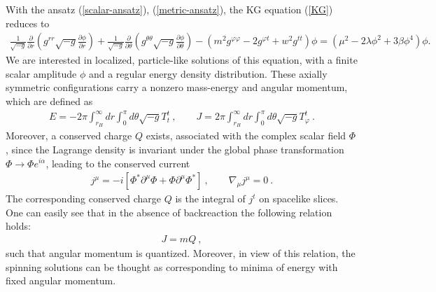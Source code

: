With the ansatz (\ref{scalar-ansatz}), (\ref{metric-ansatz}), 
the KG equation (\ref{KG})
reduces to
\begin{eqnarray}
\label{KG1}
\frac{1}{\sqrt{-g}}\frac{\partial}{\partial r}\left(g^{rr}\sqrt{-g}\frac{\partial \phi}{\partial r} \right)+
\frac{1}{\sqrt{-g}}\frac{\partial}{\partial \theta} \left(g^{\theta \theta}\sqrt{-g}\frac{\partial \phi}{\partial \theta} \right)
-\left(
m^2 g^{\varphi \varphi}-2g^{\varphi t} +w^2 g^{tt} 
\right)\phi
=(\mu^2-2 \lambda \phi^2+3\beta \phi^4)\phi.~{~}
\end{eqnarray}
We are interested in 
localized, particle-like solutions of this equation,
 with a finite scalar amplitude $\phi$ and a regular energy density distribution.
These axially symmetric configurations carry a nonzero 
  mass-energy and angular momentum,  which are defined as
\begin{eqnarray}
\label{scalar-charges}
E=-2\pi \int_{r_H}^\infty dr \int_0^\pi d\theta \sqrt{-g}T_t^t\ , \qquad 
J= 2\pi \int_{r_H}^\infty dr \int_0^\pi d\theta \sqrt{-g}T_\varphi^t \ .
 \end{eqnarray}
%
Moreover, a conserved charge $Q$ exists, associated with the complex scalar field $\Phi$, since the Lagrange density is invariant under the global phase transformation
$\Phi \to \Phi e^{i\alpha}$, 
 leading to the conserved current
 \begin{eqnarray}
\label{scalar-current}
j^{\mu}=-i\left[\Phi^* \partial^\mu\Phi+\Phi \partial^\mu\Phi^*\right]\ , \qquad \nabla_\mu j^{\mu}=0 \ .
 \end{eqnarray}
The corresponding conserved charge $Q$ is the integral of $j^t$ on spacelike slices.
One can easily see that in the absence of backreaction the following relation holds:
 \begin{eqnarray}
\label{rel1}
J=m Q\ ,
\end{eqnarray}
such that  angular momentum  is quantized.
Moreover,
in view of this relation, the spinning solutions
can be thought as corresponding to minima of energy with fixed angular
momentum.
 
